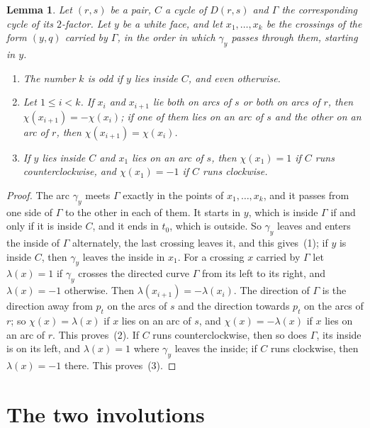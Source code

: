 \documentclass[a4paper]{amsart}
\newtheorem{lemma}[theorem]{Lemma}
\begin{document}
\begin{lemma}\label{crossings}
Let $(r,s)$ be a pair, $C$ a cycle of $D(r,s)$ and $\Gamma$ the corresponding cycle of its $2$-factor.
Let $y$ be a white face, and let $x_1,\dots,x_k$ be the crossings of the form $(y,q)$ carried by $\Gamma$, in the order in which $\gamma_y$ passes through them, starting in $y$.
\begin{enumerate}
\item The number $k$ is odd if $y$ lies inside $C$, and even otherwise.
\item Let $1\le i<k$. If $x_i$ and $x_{i+1}$ lie both on arcs of $s$ or both on arcs of $r$, then $\chi(x_{i+1})=-\chi(x_i)$; if one of them lies on an arc of $s$ and the other on an arc of $r$, then $\chi(x_{i+1})=\chi(x_i)$.
\item If $y$ lies inside $C$ and $x_1$ lies on an arc of $s$, then $\chi(x_1)=1$ if $C$ runs counterclockwise, and $\chi(x_1)=-1$ if $C$ runs clockwise.
\end{enumerate}
\end{lemma}

\begin{proof}
The arc $\gamma_y$ meets $\Gamma$ exactly in the points of $x_1,\dots,x_k$, and it passes from one side of $\Gamma$ to the other in each of them.
It starts in $y$, which is inside $\Gamma$ if and only if it is inside $C$, and it ends in $t_0$, which is outside.
So $\gamma_y$ leaves and enters the inside of $\Gamma$ alternately, the last crossing leaves it, and this gives~(1); if $y$ is inside $C$, then $\gamma_y$ leaves the inside in $x_1$.
For a crossing $x$ carried by $\Gamma$ let $\lambda(x)=1$ if $\gamma_y$ crosses the directed curve $\Gamma$ from its left to its right, and $\lambda(x)=-1$ otherwise.
Then $\lambda(x_{i+1})=-\lambda(x_i)$.
The direction of $\Gamma$ is the direction away from $p_t$ on the arcs of $s$ and the direction towards $p_t$ on the arcs of $r$; so $\chi(x)=\lambda(x)$ if $x$ lies on an arc of $s$, and $\chi(x)=-\lambda(x)$ if $x$ lies on an arc of $r$.
This proves~(2).
If $C$ runs counterclockwise, then so does $\Gamma$, its inside is on its left, and $\lambda(x)=1$ where $\gamma_y$ leaves the inside; if $C$ runs clockwise, then $\lambda(x)=-1$ there.
This proves~(3).
\end{proof}

\section{The two involutions}
\end{document}
